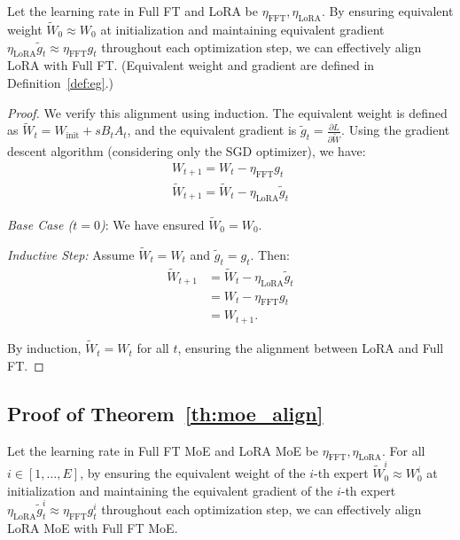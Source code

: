 \begin{tcolorbox}[colback=gray!20,colframe=gray]
\begin{Theorem2}[3.1]
Let the learning rate in Full FT and LoRA be $\eta_{\text{FFT}}, \eta_\text{LoRA}$.
By ensuring equivalent weight \( \tilde{W}_0 \approx W_0 \) at initialization and maintaining equivalent gradient \( \eta_{\text{LoRA}}\tilde{g}_t \approx \eta_{\text{FFT}} g_t \)  throughout each optimization step, we can effectively align LoRA with Full FT. (Equivalent weight and gradient are defined in Definition~\ref{def:eg}.)
\end{Theorem2}
\end{tcolorbox}

\begin{proof}
We verify this alignment using induction. The equivalent weight is defined as \( \tilde{W}_t = W_{\text{init}} + sB_tA_t \), and the equivalent gradient is \( \tilde{g}_t = \frac{\partial L}{\partial \tilde{W}} \).   
Using the gradient descent algorithm (considering only the SGD optimizer), we have:
\begin{align}
W_{t+1} = W_{t} - \eta_{\text{FFT}} g_t \\
\tilde W_{t+1} = \tilde W_t - \eta_\text{LoRA} \tilde g_{t}
\end{align}

\textit{Base Case (\( t = 0 \))}: We have ensured \( \tilde{W}_0 = W_0 \).

\textit{Inductive Step:} 
Assume \( \tilde{W}_t = W_t \) and \( \tilde{g}_t = g_t \). Then:
\begin{align}
    \tilde{W}_{t+1} &= \tilde{W}_t - \eta_{\text{LoRA}} \tilde{g}_t \\
                     &= W_t - \eta_{\text{FFT}} g_t \\
                     &= W_{t+1}.
\end{align}

By induction, \( \tilde{W}_t = W_t \) for all \( t \), ensuring the alignment between LoRA and Full FT.
\end{proof}

\subsection{Proof of Theorem~\ref{th:moe_align}}
\begin{tcolorbox}[colback=gray!20,colframe=gray]
\begin{Theorem2}[3.2]
Let the learning rate in Full FT MoE and LoRA MoE be $\eta_{\text{FFT}}, \eta_\text{LoRA}$.
For all \( i \in [1, \dots, E] \), by ensuring the equivalent weight of the \(i\)-th expert \( \tilde{W}^i_0 \approx W^i_0 \) at initialization and maintaining the equivalent gradient of the \(i\)-th expert \( \eta_{\text{LoRA}}\tilde{g}^i_t \approx \eta_{\text{FFT}}g^i_t \) throughout each optimization step, we can effectively align LoRA MoE with Full FT MoE.
\end{Theorem2}
\end{tcolorbox}


